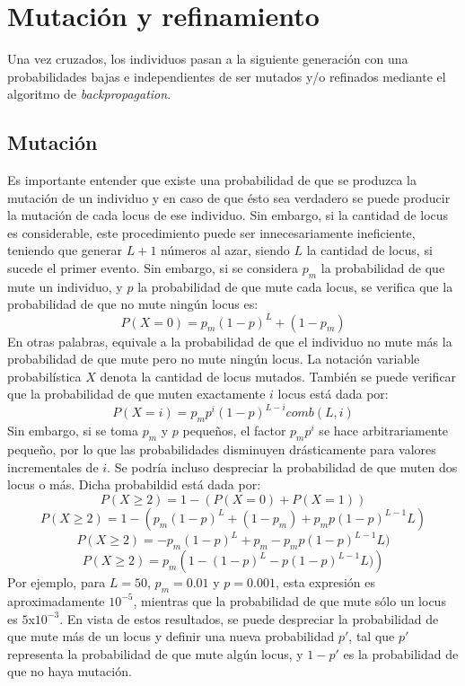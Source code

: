 \documentclass[%
    final,
    reprint,
    notitlepage,
    narroweqnarray,
    inline,
    twoside,
    invited
    ]{ieee}
\begin{document}
\section{Mutación y refinamiento}


\par Una vez cruzados, los individuos pasan a la siguiente generación con una 
probabilidades bajas e independientes de ser mutados y/o refinados 
mediante el algoritmo de \textit{backpropagation}.
\subsection{Mutación}
\par Es importante entender que existe una probabilidad de que se produzca la mutación de
un individuo y en caso de que ésto sea verdadero se puede producir la
mutación de cada locus de ese individuo. Sin embargo, si la cantidad de locus es considerable, 
este procedimiento puede ser innecesariamente ineficiente, teniendo que generar $L+1$ números 
al azar, siendo $L$ la cantidad de locus, si sucede el primer evento. Sin embargo, si se 
considera $p_m$ la probabilidad de que mute un individuo, y $p$ la probabilidad de que mute cada locus, se verifica 
que la probabilidad de que no mute ningún locus es:
\[P(X=0) = p_m(1-p)^{L}+(1-p_m)\]
En otras palabras, equivale a la probabilidad de que el individuo no mute más la probabilidad de que mute pero 
no mute ningún locus. La notación variable probabilística $X$ denota la cantidad de locus mutados. 
También se puede verificar que la probabilidad de que muten exactamente $i$ locus está dada por:
\[P(X=i) = p_mp^i(1-p)^{L-i}comb(L,i)\]
Sin embargo, si se toma $p_m$ y $p$ pequeños, el factor $p_mp^i$ se hace arbitrariamente pequeño, por 
lo que las probabilidades disminuyen drásticamente para valores incrementales de $i$. Se podría incluso 
despreciar la probabilidad de que muten dos locus o más. Dicha probabildid está dada por:
\[P(X\ge 2) = 1 - (P(X=0) + P(X=1))\]
\[P(X\ge 2) = 1 - (p_m(1-p)^{L}+(1-p_m) + p_mp(1-p)^{L-1}L)\]
\[P(X\ge 2) = -p_m(1-p)^{L}+p_m - p_mp(1-p)^{L-1}L)\]
\[P(X\ge 2) = p_m\left(1 - (1-p)^{L} - p(1-p)^{L-1}L)\right)\]
Por ejemplo, para $L=50$, $p_m=0.01$ y $p=0.001$, esta expresión es aproximadamente $10^{-5}$, mientras 
que la probabilidad de que mute sólo un locus es $5$x$10^{-3}$. En vista de estos resultados, se puede 
 despreciar la probabilidad de que mute más de un locus y definir una nueva probabilidad $p'$, tal que 
 $p'$ representa la probabilidad de que mute algún locus, y $1-p'$ es la probabilidad de que no haya mutación.
\end{document}
